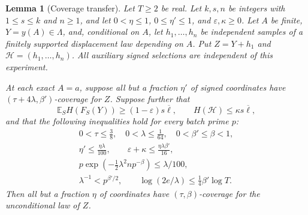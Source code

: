 \documentclass[11pt]{article}
\numberwithin{equation}{section}
\newtheorem{lemma}[theorem]{Lemma}
\theoremstyle{definition}\newtheorem{definition}[theorem]{Definition}
\theoremstyle{remark}\newtheorem{remark}[theorem]{Remark}
\newcommand{\E}{\mathbb E}\newcommand{\Prob}{\mathbb P}
\newcommand{\Lb}{\overline{\ell}}
\begin{document}
\begin{lemma}[Coverage transfer]\label{lem:coverage}
Let $T\ge2$ be real. Let $k,s,n$ be integers with $1\le s\le k$ and $n\ge1$, and let $0<\eta\le1$, $0\le\eta'\le1$, and $\varepsilon,\kappa\ge0$. Let $A$ be finite, $Y=y(A)\in\Lambda$, and, conditional on $A$, let $h_1,\ldots,h_n$ be independent samples of a finitely supported displacement law depending on $A$. Put $Z=Y+h_1$ and $\mathcal H=(h_1,\ldots,h_n)$. All auxiliary signed selections are independent of this experiment.

At each exact $A=a$, suppose all but a fraction $\eta'$ of signed coordinates have $(\tau+4\lambda,\beta')$-coverage for $Z$. Suppose further that
\[
 \E_S H(F_S(Y))\ge(1-\varepsilon)s\Lb,
 \qquad H(\mathcal H)\le\kappa s\Lb,
\]
and that the following inequalities hold for every batch prime $p$:
\begin{gather}
 0<\tau\le\tfrac38,\quad 0<\lambda\le\tfrac1{64},\quad
 0<\beta'\le\beta<1,\label{eq:covdomains}\\
 \eta'\le\frac{\eta\lambda}{100},\qquad
 \varepsilon+\kappa\le\frac{\eta\lambda\beta'}{16},\label{eq:coverrors}\\
 p\exp\left(-\tfrac12\lambda^2np^{-\beta}\right)\le\lambda/100,\label{eq:covconcentration}\\
 \lambda^{-1}<p^{\beta'/2},\qquad
 \log(2e/\lambda)\le\tfrac14\beta'\log T.\label{eq:covlogs}
\end{gather}
Then all but a fraction $\eta$ of coordinates have $(\tau,\beta)$-coverage for the unconditional law of $Z$.
\end{lemma}
\end{document}
